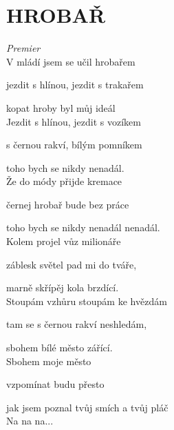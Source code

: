 \section*{\Huge HROBAŘ}
\emph{Premier}\\

V mládí jsem se učil hrobařem

jezdit s hlínou, jezdit s trakařem

kopat hroby byl můj ideál \hspace{0.1cm} \\


Jezdit s hlínou, jezdit s vozíkem

s černou rakví, bílým pomníkem

toho bych se nikdy nenadál.\\

Že do módy přijde kremace

černej hrobař bude bez práce

toho bych se nikdy nenadál nenadál.\\

Kolem projel vůz milionáře

záblesk světel pad mi do tváře,

marně skřípěj kola brzdící.\\

Stoupám vzhůru stoupám ke hvězdám

tam se s černou rakví neshledám,

sbohem bílé město zářící.\\

Sbohem moje město

vzpomínat budu přesto

jak jsem poznal tvůj smích a tvůj pláč\\

Na na na...

\newpage
